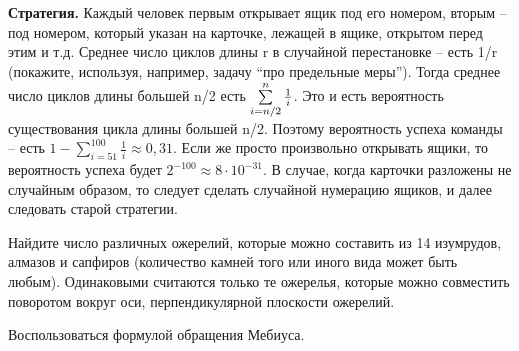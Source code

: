\textbf{Стратегия. }Каждый человек первым открывает ящик под его номером, 
вторым -- под номером, который указан на карточке, лежащей в ящике, открытом 
перед этим и т.д. Среднее число циклов длины r в случайной 
перестановке -- есть 1/r (покажите, используя, например, задачу ``про 
предельные меры''). Тогда среднее число циклов длины большей n/2 
есть $\sum\limits_{i=n \mathord{\left/ {\vphantom {n 2}} \right. 
\kern-\nulldelimiterspace} 2}^n {\frac{1}{i}} $. Это и есть вероятность 
существования цикла длины большей n/2. Поэтому вероятность успеха команды -- 
есть $1-\sum\limits_{i=51}^{100} {\frac{1}{i}} \approx 0,31$. Если 
же просто произвольно открывать ящики, то вероятность успеха будет 
$2^{-100}\approx 8\cdot 10^{-31}$. В случае, когда карточки 
разложены не случайным образом, то следует сделать случайной нумерацию 
ящиков, и далее следовать старой стратегии.

\begin{problem}
Найдите число различных ожерелий, которые можно 
составить из 14 изумрудов, алмазов и сапфиров (количество камней того или 
иного вида может быть любым). Одинаковыми считаются только те ожерелья, которые можно совместить  поворотом вокруг оси, перпендикулярной плоскости ожерелий.

\begin{ordre}
Воспользоваться формулой обращения Мебиуса.
\end{ordre}
   
\end{problem} 